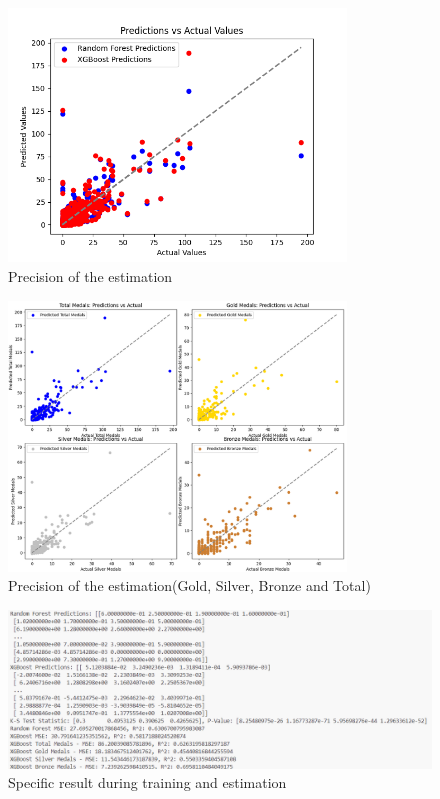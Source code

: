 \begin{figure}[htbp]
    \centering
    \includegraphics[width=0.8\textwidth]{./figures/K-S_0.png}
    \caption{Precision of the estimation}
    \label{fig:K-S_0}
\end{figure}

\begin{figure}[htbp]
    \centering
    \includegraphics[width=0.8\textwidth]{./figures/K-S_4.png}
    \caption{Precision of the estimation(Gold, Silver, Bronze and Total)}
    \label{fig:K-S_4}
\end{figure}

\begin{figure}[htbp]
    \centering
    \includegraphics[width=1\textwidth]{./figures/refer_KS_other.png}
    \caption{Specific result during training and estimation}
    \label{fig:refer_KS_other}
\end{figure}

